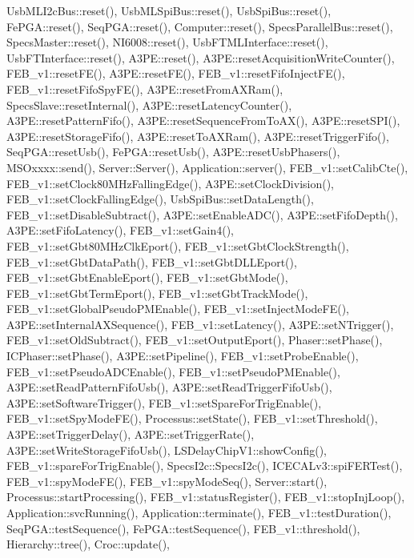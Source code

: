 Usb\+M\+L\+I2c\+Bus\+::reset(), Usb\+M\+L\+Spi\+Bus\+::reset(), Usb\+Spi\+Bus\+::reset(), Fe\+P\+G\+A\+::reset(), Seq\+P\+G\+A\+::reset(), Computer\+::reset(), Specs\+Parallel\+Bus\+::reset(), Specs\+Master\+::reset(), N\+I6008\+::reset(), Usb\+F\+T\+M\+L\+Interface\+::reset(), Usb\+F\+T\+Interface\+::reset(), A3\+P\+E\+::reset(), A3\+P\+E\+::reset\+Acquisition\+Write\+Counter(), F\+E\+B\+\_\+v1\+::reset\+F\+E(), A3\+P\+E\+::reset\+F\+E(), F\+E\+B\+\_\+v1\+::reset\+Fifo\+Inject\+F\+E(), F\+E\+B\+\_\+v1\+::reset\+Fifo\+Spy\+F\+E(), A3\+P\+E\+::reset\+From\+A\+X\+Ram(), Specs\+Slave\+::reset\+Internal(), A3\+P\+E\+::reset\+Latency\+Counter(), A3\+P\+E\+::reset\+Pattern\+Fifo(), A3\+P\+E\+::reset\+Sequence\+From\+To\+A\+X(), A3\+P\+E\+::reset\+S\+P\+I(), A3\+P\+E\+::reset\+Storage\+Fifo(), A3\+P\+E\+::reset\+To\+A\+X\+Ram(), A3\+P\+E\+::reset\+Trigger\+Fifo(), Seq\+P\+G\+A\+::reset\+Usb(), Fe\+P\+G\+A\+::reset\+Usb(), A3\+P\+E\+::reset\+Usb\+Phasers(), M\+S\+Oxxxx\+::send(), Server\+::\+Server(), Application\+::server(), F\+E\+B\+\_\+v1\+::set\+Calib\+Cte(), F\+E\+B\+\_\+v1\+::set\+Clock80\+M\+Hz\+Falling\+Edge(), A3\+P\+E\+::set\+Clock\+Division(), F\+E\+B\+\_\+v1\+::set\+Clock\+Falling\+Edge(), Usb\+Spi\+Bus\+::set\+Data\+Length(), F\+E\+B\+\_\+v1\+::set\+Disable\+Subtract(), A3\+P\+E\+::set\+Enable\+A\+D\+C(), A3\+P\+E\+::set\+Fifo\+Depth(), A3\+P\+E\+::set\+Fifo\+Latency(), F\+E\+B\+\_\+v1\+::set\+Gain4(), F\+E\+B\+\_\+v1\+::set\+Gbt80\+M\+Hz\+Clk\+Eport(), F\+E\+B\+\_\+v1\+::set\+Gbt\+Clock\+Strength(), F\+E\+B\+\_\+v1\+::set\+Gbt\+Data\+Path(), F\+E\+B\+\_\+v1\+::set\+Gbt\+D\+L\+L\+Eport(), F\+E\+B\+\_\+v1\+::set\+Gbt\+Enable\+Eport(), F\+E\+B\+\_\+v1\+::set\+Gbt\+Mode(), F\+E\+B\+\_\+v1\+::set\+Gbt\+Term\+Eport(), F\+E\+B\+\_\+v1\+::set\+Gbt\+Track\+Mode(), F\+E\+B\+\_\+v1\+::set\+Global\+Pseudo\+P\+M\+Enable(), F\+E\+B\+\_\+v1\+::set\+Inject\+Mode\+F\+E(), A3\+P\+E\+::set\+Internal\+A\+X\+Sequence(), F\+E\+B\+\_\+v1\+::set\+Latency(), A3\+P\+E\+::set\+N\+Trigger(), F\+E\+B\+\_\+v1\+::set\+Old\+Subtract(), F\+E\+B\+\_\+v1\+::set\+Output\+Eport(), Phaser\+::set\+Phase(), I\+C\+Phaser\+::set\+Phase(), A3\+P\+E\+::set\+Pipeline(), F\+E\+B\+\_\+v1\+::set\+Probe\+Enable(), F\+E\+B\+\_\+v1\+::set\+Pseudo\+A\+D\+C\+Enable(), F\+E\+B\+\_\+v1\+::set\+Pseudo\+P\+M\+Enable(), A3\+P\+E\+::set\+Read\+Pattern\+Fifo\+Usb(), A3\+P\+E\+::set\+Read\+Trigger\+Fifo\+Usb(), A3\+P\+E\+::set\+Software\+Trigger(), F\+E\+B\+\_\+v1\+::set\+Spare\+For\+Trig\+Enable(), F\+E\+B\+\_\+v1\+::set\+Spy\+Mode\+F\+E(), Processus\+::set\+State(), F\+E\+B\+\_\+v1\+::set\+Threshold(), A3\+P\+E\+::set\+Trigger\+Delay(), A3\+P\+E\+::set\+Trigger\+Rate(), A3\+P\+E\+::set\+Write\+Storage\+Fifo\+Usb(), L\+S\+Delay\+Chip\+V1\+::show\+Config(), F\+E\+B\+\_\+v1\+::spare\+For\+Trig\+Enable(), Specs\+I2c\+::\+Specs\+I2c(), I\+C\+E\+C\+A\+Lv3\+::spi\+F\+E\+R\+Test(), F\+E\+B\+\_\+v1\+::spy\+Mode\+F\+E(), F\+E\+B\+\_\+v1\+::spy\+Mode\+Seq(), Server\+::start(), Processus\+::start\+Processing(), F\+E\+B\+\_\+v1\+::status\+Register(), F\+E\+B\+\_\+v1\+::stop\+Inj\+Loop(), Application\+::svc\+Running(), Application\+::terminate(), F\+E\+B\+\_\+v1\+::test\+Duration(), Seq\+P\+G\+A\+::test\+Sequence(), Fe\+P\+G\+A\+::test\+Sequence(), F\+E\+B\+\_\+v1\+::threshold(), Hierarchy\+::tree(), Croc\+::update(), 